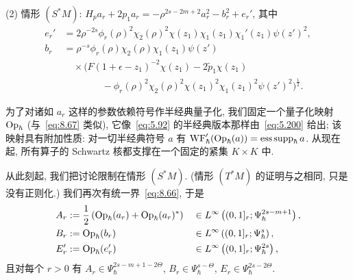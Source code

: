 (2) 情形 $(S^*M)$: $H_p a_r + 2p_1 a_r = -\rho^{2s-2m+2}a_r^2 - b_r^2 + e_r'$, 其中
\begin{equation}\label{eq:8.107}
    \begin{aligned}
        e_r' &= 2\rho^{-2s}\phi_r(\rho)^2\chi_2(\rho)^2\chi(z_1)\chi_1(z_1)\chi_1'(z_1)\psi(z')^2, \\
        b_r &= \rho^{-s}\phi_r(\rho)\chi_2(\rho)\chi_1(z_1)\psi(z') \\
        &\quad \times \Big( F(1 + \epsilon - z_1)^{-2}\chi(z_1) - 2\tilde{p}_1\chi(z_1) \\
        &\qquad\qquad - \phi_r(\rho)^2\chi_2(\rho)^2\chi(z_1)^2\chi_1(z_1)^2\psi(z')^2 \Big)^{\frac{1}{2}}.
    \end{aligned}
\end{equation}

为了对诸如 $a_r$ 这样的参数依赖符号作半经典量子化, 我们固定一个量子化映射 $\operatorname{Op}_\hbar$ (与~\eqref{eq:8.67} 类似), 它像~\eqref{eq:5.92} 的半经典版本那样由~\eqref{eq:5.200} 给出; 该映射具有附加性质: 对一切半经典符号 $a$ 有 $\operatorname{WF}_\hbar'(\operatorname{Op}_\hbar(a)) = \operatorname{ess\,supp}_\hbar a$. 从现在起, 所有算子的 Schwartz 核都支撑在一个固定的紧集 $K \times K$ 中.

从此刻起, 我们把讨论限制在情形 $(S^*M)$. (情形 $(T^*M)$ 的证明与之相同, 只是没有正则化.) 我们再次有统一界~\eqref{eq:8.66}, 于是
\begin{equation}\label{eq:8.108}
    \begin{aligned}
        A_r &:= \frac{1}{2}\left( \operatorname{Op}_\hbar(a_r) + \operatorname{Op}_\hbar(a_r)^* \right) &&\in L^\infty\left( (0, 1]_r; \Psi_\hbar^{2s-m+1} \right), \\
        B_r &:= \operatorname{Op}_\hbar(b_r) &&\in L^\infty\left( (0, 1]_r; \Psi_\hbar^s \right), \\
        E_r' &:= \operatorname{Op}_\hbar(e_r') &&\in L^\infty\left( (0, 1]_r; \Psi_\hbar^{2s} \right),
    \end{aligned}
\end{equation}
且对每个 $r > 0$ 有 $A_r \in \Psi_\hbar^{2s-m+1-2\Theta}$, $B_r \in \Psi_\hbar^{s-\Theta}$, $E_r \in \Psi_\hbar^{2s-2\Theta}$.

